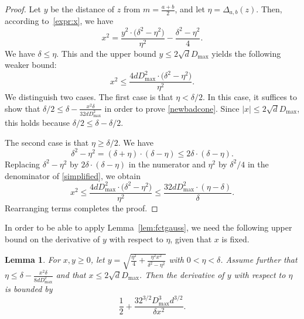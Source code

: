 \documentclass[11pt,DIV=12,a4paper]{scrartcl}
\newtheorem{lemma}[claim]{Lemma}
\newcommand{\maxx}{D_{\max}}
\begin{document}
\begin{proof}
Let $y$ be the distance of $z$ from $m = \frac{a+b}2$, and let $\eta = \Delta_{a,b}(z)$. Then, according to~\eqref{expr:x}, we have
\[
  x^2 = \frac{y^2 \cdot \bigl(\delta^2 - \eta^2)}{\eta^2} - \frac{\delta^2 - \eta^2}{4}.
\]
We have $\delta \leq \eta$. This and the upper bound $y \leq 2\sqrt d \maxx$ yields the following weaker bound:
\begin{equation}
  x^2 \leq \frac{4 d \maxx^2 \cdot \bigl(\delta^2 - \eta^2)}{\eta^2} . \label{simplified}
\end{equation}
We distinguish two cases.
The first case is that $\eta < \delta/2$.
In this case, it suffices to show that $\delta/2 \leq \delta - \frac{x^2 \delta }{32 d \maxx^2}$ in order to prove \eqref{newbadcone}.
Since $|x| \leq 2 \sqrt d \maxx$, this holds because
$\delta/2 \leq \delta - \delta/2$.

The second case is that $\eta \geq \delta/2$.
We have
\[
  \delta^2 - \eta^2 = (\delta + \eta) \cdot (\delta - \eta) \leq 2 \delta \cdot (\delta - \eta).
\]
Replacing $\delta^2-\eta^2$ by $2 \delta \cdot (\delta - \eta)$ in the numerator and $\eta^2$ by $\delta^2/4$ in the denominator of \eqref{simplified},
we obtain
\[
  x^2 \leq 
  \frac{4 d \maxx^2 \cdot \bigl(\delta^2 - \eta^2)}{\eta^2}  \leq \frac{32 d \maxx^2 \cdot (\eta - \delta)}{\delta}.
\]
Rearranging terms completes the proof.
\end{proof}


In order to be able to apply Lemma~\ref{lem:fctgauss}, we need the following
upper bound on the derivative of $y$ with respect to $\eta$, given that $x$ is fixed.

\begin{lemma}
\label{lem:derivative}
For $x, y \geq 0$, let
$y = \sqrt{\frac{\eta^2}4 + \frac{\eta^2x^2}{\delta^2 - \eta^2}}$ with $0 < \eta < \delta$.
Assume further that
$\eta \leq \delta - \frac{x^2\delta}{8d \maxx^2}$
and that $x \leq 2 \sqrt d \maxx$.
Then the derivative of $y$ with respect to $\eta$ is bounded by
\[
\frac 12 + \frac{32^{3/2}\maxx^3d^{3/2}}{\delta x^2} .
\]
\end{lemma}
\end{document}
